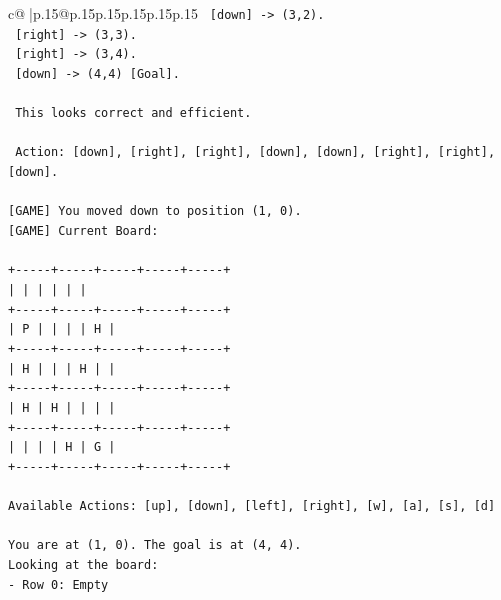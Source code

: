 \documentclass{article}
\begin{document}
{\begin{supertabular}{c@{$\;$}|p{.15\linewidth}@{}p{.15\linewidth}p{.15\linewidth}p{.15\linewidth}p{.15\linewidth}p{.15\linewidth}}
{{{\texttt{   {[}down{]} {-}> (3,2).} \\
\texttt{   {[}right{]} {-}> (3,3).} \\
\texttt{   {[}right{]} {-}> (3,4).} \\
\texttt{   {[}down{]} {-}> (4,4) {[}Goal{]}.} \\
\\ 
\texttt{   This looks correct and efficient.} \\
\\ 
\texttt{   Action: {[}down{]}, {[}right{]}, {[}right{]}, {[}down{]}, {[}down{]}, {[}right{]}, {[}right{]}, {[}down{]}.} \\
\\ 
\texttt{{[}GAME{]} You moved down to position (1, 0).} \\
\texttt{{[}GAME{]} Current Board:} \\
\\ 
\texttt{+{-}{-}{-}{-}{-}+{-}{-}{-}{-}{-}+{-}{-}{-}{-}{-}+{-}{-}{-}{-}{-}+{-}{-}{-}{-}{-}+} \\
\texttt{|     |     |     |     |     |} \\
\texttt{+{-}{-}{-}{-}{-}+{-}{-}{-}{-}{-}+{-}{-}{-}{-}{-}+{-}{-}{-}{-}{-}+{-}{-}{-}{-}{-}+} \\
\texttt{|  P  |     |     |     |  H  |} \\
\texttt{+{-}{-}{-}{-}{-}+{-}{-}{-}{-}{-}+{-}{-}{-}{-}{-}+{-}{-}{-}{-}{-}+{-}{-}{-}{-}{-}+} \\
\texttt{|  H  |     |     |  H  |     |} \\
\texttt{+{-}{-}{-}{-}{-}+{-}{-}{-}{-}{-}+{-}{-}{-}{-}{-}+{-}{-}{-}{-}{-}+{-}{-}{-}{-}{-}+} \\
\texttt{|  H  |  H  |     |     |     |} \\
\texttt{+{-}{-}{-}{-}{-}+{-}{-}{-}{-}{-}+{-}{-}{-}{-}{-}+{-}{-}{-}{-}{-}+{-}{-}{-}{-}{-}+} \\
\texttt{|     |     |     |  H  |  G  |} \\
\texttt{+{-}{-}{-}{-}{-}+{-}{-}{-}{-}{-}+{-}{-}{-}{-}{-}+{-}{-}{-}{-}{-}+{-}{-}{-}{-}{-}+} \\
\\ 
\texttt{Available Actions: {[}up{]}, {[}down{]}, {[}left{]}, {[}right{]}, {[}w{]}, {[}a{]}, {[}s{]}, {[}d{]}} \\
\\ 
\texttt{You are at (1, 0). The goal is at (4, 4).} \\
\texttt{Looking at the board:} \\
\texttt{{-} Row 0: Empty} \\
}}}
\end{supertabular}}
\end{document}
